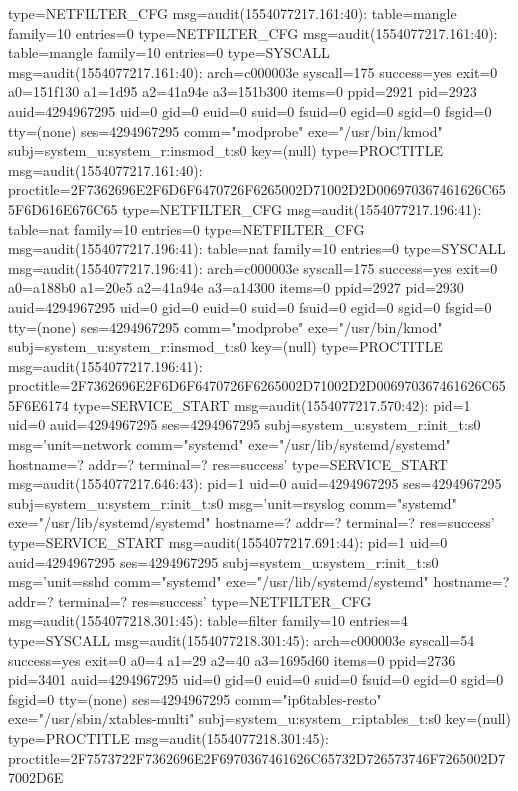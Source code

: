 \documentclass[]{report}
\newenvironment{Shaded}{}{}
\newcommand{\NormalTok}[1]{#1}
\begin{document}
\begin{Shaded}
\begin{Highlighting}[]
\NormalTok{type=NETFILTER_CFG msg=audit(1554077217.161:40): table=mangle family=10 entries=0}
\NormalTok{type=NETFILTER_CFG msg=audit(1554077217.161:40): table=mangle family=10 entries=0}
\NormalTok{type=SYSCALL msg=audit(1554077217.161:40): arch=c000003e syscall=175 success=yes exit=0 a0=151f130 a1=1d95 a2=41a94e a3=151b300 items=0 ppid=2921 pid=2923 auid=4294967295 uid=0 gid=0 euid=0 suid=0 fsuid=0 egid=0 sgid=0 fsgid=0 tty=(none) ses=4294967295 comm="modprobe" exe="/usr/bin/kmod" subj=system_u:system_r:insmod_t:s0 key=(null)}
\NormalTok{type=PROCTITLE msg=audit(1554077217.161:40): proctitle=2F7362696E2F6D6F6470726F6265002D71002D2D006970367461626C655F6D616E676C65}
\NormalTok{type=NETFILTER_CFG msg=audit(1554077217.196:41): table=nat family=10 entries=0}
\NormalTok{type=NETFILTER_CFG msg=audit(1554077217.196:41): table=nat family=10 entries=0}
\NormalTok{type=SYSCALL msg=audit(1554077217.196:41): arch=c000003e syscall=175 success=yes exit=0 a0=a188b0 a1=20e5 a2=41a94e a3=a14300 items=0 ppid=2927 pid=2930 auid=4294967295 uid=0 gid=0 euid=0 suid=0 fsuid=0 egid=0 sgid=0 fsgid=0 tty=(none) ses=4294967295 comm="modprobe" exe="/usr/bin/kmod" subj=system_u:system_r:insmod_t:s0 key=(null)}
\NormalTok{type=PROCTITLE msg=audit(1554077217.196:41): proctitle=2F7362696E2F6D6F6470726F6265002D71002D2D006970367461626C655F6E6174}
\NormalTok{type=SERVICE_START msg=audit(1554077217.570:42): pid=1 uid=0 auid=4294967295 ses=4294967295 subj=system_u:system_r:init_t:s0 msg='unit=network comm="systemd" exe="/usr/lib/systemd/systemd" hostname=? addr=? terminal=? res=success'}
\NormalTok{type=SERVICE_START msg=audit(1554077217.646:43): pid=1 uid=0 auid=4294967295 ses=4294967295 subj=system_u:system_r:init_t:s0 msg='unit=rsyslog comm="systemd" exe="/usr/lib/systemd/systemd" hostname=? addr=? terminal=? res=success'}
\NormalTok{type=SERVICE_START msg=audit(1554077217.691:44): pid=1 uid=0 auid=4294967295 ses=4294967295 subj=system_u:system_r:init_t:s0 msg='unit=sshd comm="systemd" exe="/usr/lib/systemd/systemd" hostname=? addr=? terminal=? res=success'}
\NormalTok{type=NETFILTER_CFG msg=audit(1554077218.301:45): table=filter family=10 entries=4}
\NormalTok{type=SYSCALL msg=audit(1554077218.301:45): arch=c000003e syscall=54 success=yes exit=0 a0=4 a1=29 a2=40 a3=1695d60 items=0 ppid=2736 pid=3401 auid=4294967295 uid=0 gid=0 euid=0 suid=0 fsuid=0 egid=0 sgid=0 fsgid=0 tty=(none) ses=4294967295 comm="ip6tables-resto" exe="/usr/sbin/xtables-multi" subj=system_u:system_r:iptables_t:s0 key=(null)}
\NormalTok{type=PROCTITLE msg=audit(1554077218.301:45): proctitle=2F7573722F7362696E2F6970367461626C65732D726573746F7265002D77002D6E}

\end{Highlighting}
\end{Shaded}
\end{document}
